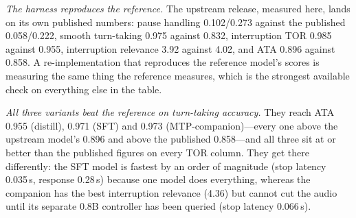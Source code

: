 \documentclass[conference]{IEEEtran}
\begin{document}
\begin{table}[t]
\centering
\caption{Full-Duplex-Bench, pt-BR (727 scenarios per model; TOR and latency
$\downarrow$ is better, TOR and rating $\uparrow$ is better; best trained result
per column in bold). ``Original'' is the upstream English release measured with
the same harness; the published row is its paper's English audio result and is
shown as a range check, not a baseline.}
\label{tab:fdb}
\footnotesize
{}
\end{table}

\emph{The harness reproduces the reference.} The upstream release, measured here,
lands on its own published numbers: pause handling 0.102/0.273 against the
published 0.058/0.222, smooth turn-taking 0.975 against 0.832, interruption TOR
0.985 against 0.955, interruption relevance 3.92 against 4.02, and ATA 0.896
against 0.858. A re-implementation that reproduces the reference model's scores is
measuring the same thing the reference measures, which is the strongest available
check on everything else in the table.

\emph{All three variants beat the reference on turn-taking accuracy.} They reach
ATA 0.955 (distill), 0.971 (SFT) and 0.973 (MTP-companion)---every one above the
upstream model's 0.896 and above the published 0.858---and all three sit at or
better than the published figures on every TOR column. They get there differently: the SFT model is fastest
by an order of magnitude (stop latency 0.035\,s, response 0.28\,s) because one
model does everything, whereas the companion has the best interruption relevance
(4.36) but cannot cut the audio until its separate 0.8B controller has been
queried (stop latency 0.066\,s).
\end{document}
